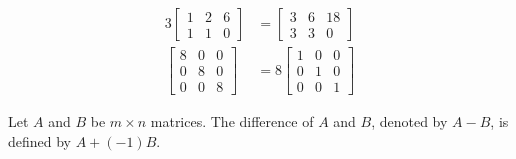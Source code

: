     \begin{example}
        \begin{align*}
            3\begin{bmatrix}
                1 & 2 & 6 \\ 1 & 1 & 0
            \end{bmatrix} &= \begin{bmatrix}
                3 & 6 & 18 \\ 3 & 3 & 0
            \end{bmatrix} \\ 
            \begin{bmatrix}
                8 & 0 & 0 \\ 0 & 8 & 0 \\ 0 & 0 & 8
            \end{bmatrix} &= 8 \begin{bmatrix}
                1 & 0 & 0 \\ 0 & 1 & 0 \\ 0 & 0 & 1
            \end{bmatrix}
        \end{align*}
    \end{example}

    \begin{dfn}
        Let \(A\) and \(B\) be \(m \times n\) matrices. The difference of \(A\) and \(B\), denoted by \(A - B\), is defined by \(A + (-1)B\).
    \end{dfn}